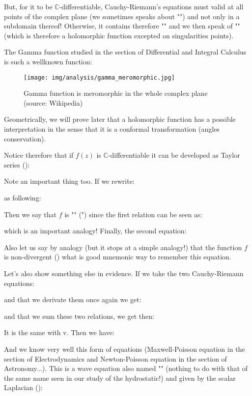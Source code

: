 	But, for it to be $\mathbb{C}$-differentiable, Cauchy-Riemann's equations must valid at all points of the complex plane (we sometimes speaks about "") and not only in a subdomain thereof! Otherwise, it contains therefore "" and we then speak of "" (which is therefore a holomorphic function excepted on singularities points).
	
	The Gamma function studied in the section of Differential and Integral Calculus is such a wellknown function:
	
	\begin{figure}[H]
		\centering
		\texttt{[image: img/analysis/gamma\_meromorphic.jpg]}
		\caption{Gamma function is meromorphic in the whole complex plane (source: Wikipedia)}
	\end{figure}
	\begin{tcolorbox}[title=Remarks,colframe=black,arc=10pt]
	Geometrically, we will prove later that a holomorphic function has a possible interpretation in the sense that it is a conformal transformation (angles conservation).
	\end{tcolorbox}
	
	Notice therefore that if $f (z)$ is $\mathbb{C}$-differentiable it can be developed as Taylor series ():
	
	Note an important thing too. If we rewrite:
	
	as following:
	
	Then we say that $f$ is "" (") since the first relation can be seen as:
	
	which is an important analogy! Finally, the second equation:
	
	Also let us say by analogy (but it stops at a simple analogy!) that the function $f$ is non-divergent () what is good mnemonic way to remember this equation.
	
	Let's also show something else in evidence. If we take the two Cauchy-Riemann equations:
	
	and that we derivate them once again we get:
	
	and that we sum these two relations, we get then:
	
	It is the same with v. Then we have:
	
	And we know very well this form of equations (Maxwell-Poisson equation in the section of Electrodynamics and Newton-Poisson equation in the section of Astronomy...). This is a wave equation also named "" (nothing to do with that of the same name seen in our study of the hydrostatic!) and given by the scalar Laplacian ():
	

